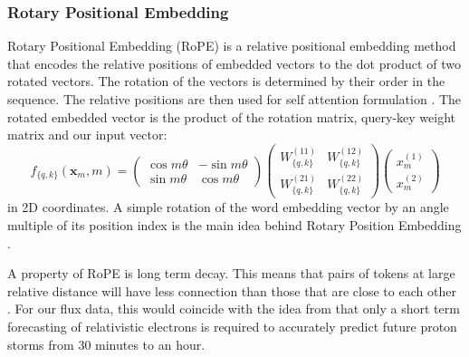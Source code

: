 \subsubsection{Rotary Positional Embedding}
Rotary Positional Embedding (RoPE) is a relative positional embedding method that encodes the  relative positions of embedded vectors to the dot product of two rotated vectors. The rotation of the vectors is determined by their order in the sequence. The relative positions are then used for self attention formulation \cite{su2021roformer}. The rotated embedded vector is the product of the rotation matrix, query-key weight matrix and our input vector:
\begin{equation}
    f_{\{q,k\}}(\mathbf{x}_m, m) = 
    \begin{pmatrix} 
    \cos m\theta & -\sin m \theta  \\
    \sin m\theta & \cos m\theta 
    \end{pmatrix}
    \begin{pmatrix} 
    W_{\{q,k\}}^{(11)} & W_{\{q,k\}}^{(12)}  \\ W_{\{q,k\}}^{(21)} & W_{\{q,k\}}^{(22)} 
    \end{pmatrix} 
    \begin{pmatrix} 
    x_m^{(1)}\\
    x_m^{(2)}
    \end{pmatrix} 
\end{equation}
in 2D coordinates. A simple rotation of the word embedding vector by an angle multiple of its position index is the main idea behind Rotary Position Embedding \cite{su2021roformer}.

A property of RoPE is long term decay. This means that pairs of tokens at large relative distance will have less connection than those that are close to each other \cite{su2021roformer}. For our flux data, this would coincide with the idea from \cite{posner2007forecasting} that only a short term forecasting of relativistic electrons is required to accurately predict future proton storms from 30 minutes to an hour. 


